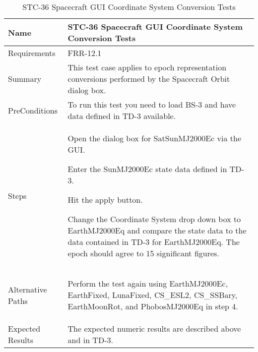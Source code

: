 \begin{table}[htbp!]
\centering
      \begin{tabular}{|p{1.05 in} |p{4.75 in} |}
      \hline
         \rowcolor[rgb]{0.8,0.8,0.8} Name & STC-36 Spacecraft GUI Coordinate System Conversion Tests\\
         \hline
         Requirements & FRR-12.1\\ \hline
         Summary &
         This test case applies to epoch representation conversions performed by the Spacecraft Orbit dialog box.  \\
         \hline
         PreConditions & To run this test you need to load BS-3 and have data defined in TD-3 available.\\
         \hline
         Steps &
         \begin{compactenum}
         \item Open the dialog box for SatSunMJ2000Ec via the GUI.
         \item Enter the SunMJ2000Ec state data  defined in TD-3.
         \item Hit the apply button.
         \item Change the Coordinate System drop down box to EarthMJ2000Eq and compare the state data to
               the data contained in TD-3 for EarthMJ2000Eq. The epoch should agree to 15 significant
               figures.
         \end{compactenum}\\
		 \hline
         Alternative Paths &
         \begin{compactenum}
         \item Perform the test again using  EarthMJ2000Ec, EarthFixed, LunaFixed, CS\_ESL2, CS\_SSBary, EarthMoonRot,  and PhobosMJ2000Eq in step 4.
         \end{compactenum}\\
         \hline
         Expected Results & The expected numeric results are described above and in TD-3.\\
      \hline
\end{tabular}
      \label{Table:STC-36}
      \caption{STC-36 Spacecraft GUI Coordinate System Conversion Tests}
\end{table}
